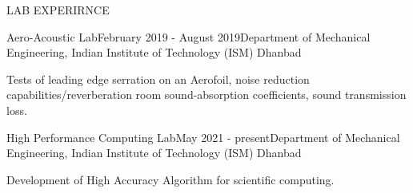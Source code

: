 \documentclass{resume} %
\begin{document}
\begin{rSection}{LAB EXPERIRNCE}

\begin{rSubsection}{Aero-Acoustic Lab}{February 2019 - August 2019}{Department of Mechanical Engineering, Indian Institute of Technology (ISM) Dhanbad}
\item Tests of leading edge serration on an Aerofoil, noise reduction capabilities/reverberation room sound-absorption coefficients, sound transmission loss.
\end{rSubsection}

\begin{rSubsection}{High Performance Computing Lab}{May 2021 - present}{Department of Mechanical Engineering, Indian Institute of Technology (ISM) Dhanbad}
\item Development of High Accuracy Algorithm for scientific computing.
\end{rSubsection}

\end{rSection}
\end{document}
